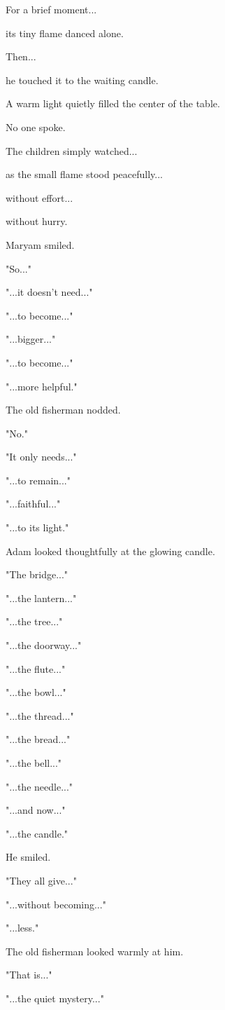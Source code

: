 \documentclass[12pt,openany]{book}
\begin{document}
For a brief moment...

its tiny flame danced alone.

Then...

he touched it to the waiting candle.

A warm light quietly filled the center of the table.

No one spoke.

The children simply watched...

as the small flame stood peacefully...

without effort...

without hurry.

Maryam smiled.

"So..."

"...it doesn't need..."

"...to become..."

"...bigger..."

"...to become..."

"...more helpful."

The old fisherman nodded.

"No."

"It only needs..."

"...to remain..."

"...faithful..."

"...to its light."

Adam looked thoughtfully at the glowing candle.

"The bridge..."

"...the lantern..."

"...the tree..."

"...the doorway..."

"...the flute..."

"...the bowl..."

"...the thread..."

"...the bread..."

"...the bell..."

"...the needle..."

"...and now..."

"...the candle."

He smiled.

"They all give..."

"...without becoming..."

"...less."

The old fisherman looked warmly at him.

"That is..."

"...the quiet mystery..."
\end{document}
